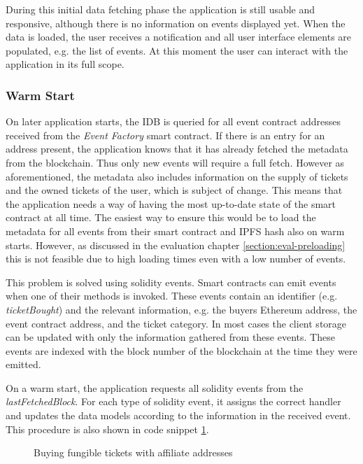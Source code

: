 During this initial data fetching phase the application is still usable and responsive, although there is no information on events displayed yet. When the data is loaded, the user receives a notification and all user interface elements are populated, e.g. the list of events.
At this moment the user can interact with the application in its full scope. 

\subsubsection{Warm Start}

On later application starts, the IDB is queried for all event contract addresses received from the \textit{Event Factory} smart contract. If there is an entry for an address present, the application knows that it has already fetched the metadata from the blockchain. Thus only new events will require a full fetch. However as aforementioned, the metadata also includes information on the supply of tickets and the owned tickets of the user, which is subject of change. This means that the application needs a way of having the most up-to-date state of the smart contract at all time. The easiest way to ensure this would be to load the metadata for all events from their smart contract and IPFS hash also on warm starts. However, as discussed in the evaluation chapter \ref{section:eval-preloading} this is not feasible due to high loading times even with a low number of events.

This problem is solved using solidity events. Smart contracts can emit events when one of their methods is invoked. These events contain an identifier (e.g. \textit{ticketBought}) and the relevant information, e.g. the buyers Ethereum address, the event contract address, and the ticket category. In most cases the client storage can be updated with only the information gathered from these events. These events are indexed with the block number of the blockchain at the time they were emitted.

On a warm start, the application requests all solidity events from the \textit{lastFetchedBlock}. For each type of solidity event, it assigns the correct handler and updates the data models according to the information in the received event. This procedure is also shown in code snippet \ref{code:eventLoading}.

\begin{figure}[H]
    
    \caption{Buying fungible tickets with affiliate addresses}
    \label{code:eventLoading}
\end{figure}

